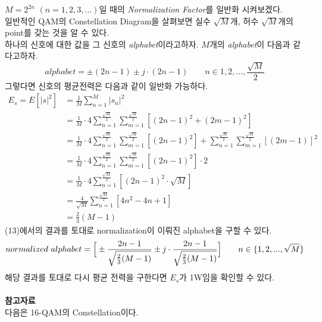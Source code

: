 \documentclass{article}
\newcommand{\bd}{\textbf} %
\providecommand{\abs}[1]{\lvert#1\rvert}
\begin{document}
$M=2^{2n}$ $(n=1,2,3,...)$일 때의 \textsl{Normalization Factor}를 일반화 시켜보겠다.\\
일반적인 QAM의 Constellation Diagram을 살펴보면 실수 $\sqrt{M}$개, 허수 $\sqrt{M}$개의 point를 갖는 것을 알 수 있다.\\
하나의 신호에 대한 값을 그 신호의 \textsl{alphabet}이라고하자. $M$개의 \textsl{alphabet}이 다음과 같다고하자.
\begin{equation}
alphabet={\pm(2n-1)\pm j\cdot(2n-1)} \qquad n\in{1,2,...,\frac{\sqrt{M}}{2}}
\end{equation}
그렇다면 신호의 평균전력은 다음과 같이 일반화 가능하다.
\begin{equation}
\begin{split}
E_s=E[\abs{s}^2]&=\frac{1}{M}\sum_{n=1}^M \abs{s_n}^2\\
&=\frac{1}{M}\cdot4\sum_{n=1}^{\frac{\sqrt{M}}{2}} \sum_{m=1}^{\frac{\sqrt{M}}{2}} [(2n-1)^2+(2m-1)^2]\\
&=\frac{1}{M}\cdot4\sum_{n=1}^{\frac{\sqrt{M}}{2}} \sum_{m=1}^{\frac{\sqrt{M}}{2}} [(2n-1)^2] + \sum_{n=1}^{\frac{\sqrt{M}}{2}} \sum_{m=1}^{\frac{\sqrt{M}}{2}}[(2m-1)]^2\\
&=\frac{1}{M}\cdot4\sum_{n=1}^{\frac{\sqrt{M}}{2}} \sum_{m=1}^{\frac{\sqrt{M}}{2}} [(2n-1)^2]\cdot2\\
&=\frac{1}{M}\cdot4\sum_{n=1}^\frac{\sqrt{M}}{2}[(2n-1)^2\cdot\sqrt{M}]\\
&=\frac{4}{\sqrt{M}}\sum_{n=1}^\frac{\sqrt{M}}{2}[4n^2-4n+1]\\
&=\frac{2}{3}(M-1)
\end{split}
\end{equation}
(13)에서의 결과를 토대로 normalization이 이뤄진 alphabet을 구할 수 있다.
\begin{equation}
normalized\ alphabet=\Big{[}\pm\frac{2n-1}{\sqrt{\frac{2}{3}(M-1)}}\pm j\cdot\frac{2n-1}{\sqrt{\frac{2}{3}(M-1)}}\Big{]} \qquad n\in\{1,2,...,\sqrt{M}\}
\end{equation}
해당 결과를 토대로 다시 평균 전력을 구한다면 $E_s$가 1W임을 확인할 수 있다.\\
\\
\bd{참고자료}\\
다음은 16-QAM의 Constellation이다.\\
\end{document}
